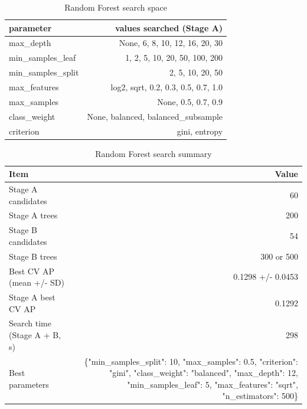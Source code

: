 \begin{table}[htbp]
\centering
\small
\caption{Random Forest search space}
\begin{tabular}{lr}
\toprule
parameter & values searched (Stage A) \\
\midrule
max\_depth & None, 6, 8, 10, 12, 16, 20, 30 \\
min\_samples\_leaf & 1, 2, 5, 10, 20, 50, 100, 200 \\
min\_samples\_split & 2, 5, 10, 20, 50 \\
max\_features & log2, sqrt, 0.2, 0.3, 0.5, 0.7, 1.0 \\
max\_samples & None, 0.5, 0.7, 0.9 \\
class\_weight & None, balanced, balanced\_subsample \\
criterion & gini, entropy \\
\bottomrule
\end{tabular}
\par\smallskip\begin{minipage}{\linewidth}\footnotesize \end{minipage}
\end{table}


\begin{table}[htbp]
\centering
\small
\caption{Random Forest search summary}
\begin{tabular}{lr}
\toprule
Item & Value \\
\midrule
Stage A candidates & 60 \\
Stage A trees & 200 \\
Stage B candidates & 54 \\
Stage B trees & 300 or 500 \\
Best CV AP (mean +/- SD) & 0.1298 +/- 0.0453 \\
Stage A best CV AP & 0.1292 \\
Search time (Stage A + B, s) & 298 \\
Best parameters & \{"min\_samples\_split": 10, "max\_samples": 0.5, "criterion": "gini", "class\_weight": "balanced", "max\_depth": 12, "min\_samples\_leaf": 5, "max\_features": "sqrt", "n\_estimators": 500\} \\
\bottomrule
\end{tabular}
\par\smallskip\begin{minipage}{\linewidth}\footnotesize \end{minipage}
\end{table}


